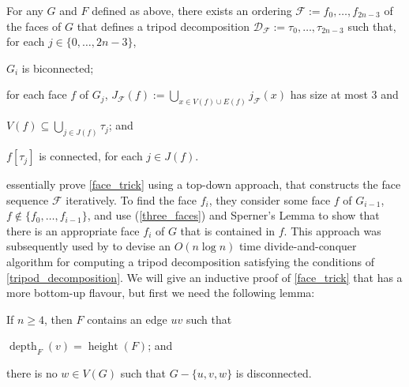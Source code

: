 \documentclass{patmorin}
\DeclareMathOperator{\height}{height}
\DeclareMathOperator{\depth}{depth}
\begin{document}
\begin{lem}\label{face_trick}
  For any $G$ and $F$ defined as above, there exists an ordering $\mathcal{F}:=f_0,\ldots,f_{2n-3}$ of the faces of $G$ that defines a tripod decomposition $\mathcal{D}_\mathcal{F}:=\tau_0,\ldots,\tau_{2n-3}$ such that, for each $j\in\{0,\ldots,2n-3\}$,
  \begin{compactenum}[(i)]
    \item \label{biconnected} $G_i$ is biconnected;
    \item \label{three_faces} for each face $f$ of $G_j$, $J_\mathcal{F}(f):=\bigcup_{x\in V(f)\cup E(f)} j_\mathcal{F}(x)$ has size at most $3$ and
    \begin{compactenum}[(a)]
      \item $V(f)\subseteq \bigcup_{j\in J(f)} \tau_{j}$; and
      \item $f[\tau_{j}]$ is connected, for each $j\in J(f)$.
    \end{compactenum}
  \end{compactenum}
\end{lem}

\citet{dujmovic.joret.ea:planar} essentially prove \cref{face_trick} using a top-down approach, that constructs the face sequence $\mathcal{F}$ iteratively.  To find the face $f_i$, they consider some face $f$ of $G_{i-1}$, $f\not\in\{f_0,\ldots,f_{i-1}\}$, and use (\ref{three_faces}) and Sperner's Lemma to show that there is an appropriate face $f_i$ of $G$ that is contained in $f$.  This approach was subsequently used by \citet{morin:fast} to devise an $O(n\log n)$ time divide-and-conquer algorithm for computing a tripod decomposition satisfying the conditions of \cref{tripod_decomposition}.  We will give an inductive proof of \cref{face_trick} that has a more bottom-up flavour, but first we need the following lemma:

\begin{lem}\label{good_deep_edge}
  If $n\ge 4$, then $F$ contains an edge $uv$ such that
  \begin{compactenum}[(i)]
    \item\label{max_depth} $\depth_{F}(v)=\height(F)$; and
    \item\label{no_separating_triangle} there is no $w\in V(G)$ such that $G-\{u,v,w\}$ is disconnected.
  \end{compactenum}
\end{lem}
\end{document}
